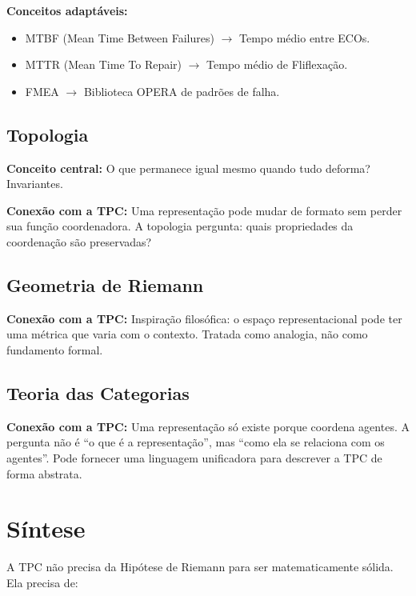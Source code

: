 \documentclass[12pt,a4paper]{article}
\begin{document}
\textbf{Conceitos adaptáveis:}
\begin{itemize}
    \item MTBF (Mean Time Between Failures) $\to$ Tempo médio entre ECOs.
    \item MTTR (Mean Time To Repair) $\to$ Tempo médio de Fliflexação.
    \item FMEA $\to$ Biblioteca OPERA de padrões de falha.
\end{itemize}

\subsection{Topologia}

\textbf{Conceito central:} O que permanece igual mesmo quando tudo deforma? Invariantes.

\textbf{Conexão com a TPC:}
Uma representação pode mudar de formato sem perder sua função coordenadora. A topologia pergunta: quais propriedades da coordenação são preservadas?

\subsection{Geometria de Riemann}

\textbf{Conexão com a TPC:}
Inspiração filosófica: o espaço representacional pode ter uma métrica que varia com o contexto. Tratada como analogia, não como fundamento formal.

\subsection{Teoria das Categorias}

\textbf{Conexão com a TPC:}
Uma representação só existe porque coordena agentes. A pergunta não é ``o que é a representação'', mas ``como ela se relaciona com os agentes''. Pode fornecer uma linguagem unificadora para descrever a TPC de forma abstrata.

\section{Síntese}

A TPC não precisa da Hipótese de Riemann para ser matematicamente sólida. Ela precisa de:
\end{document}
